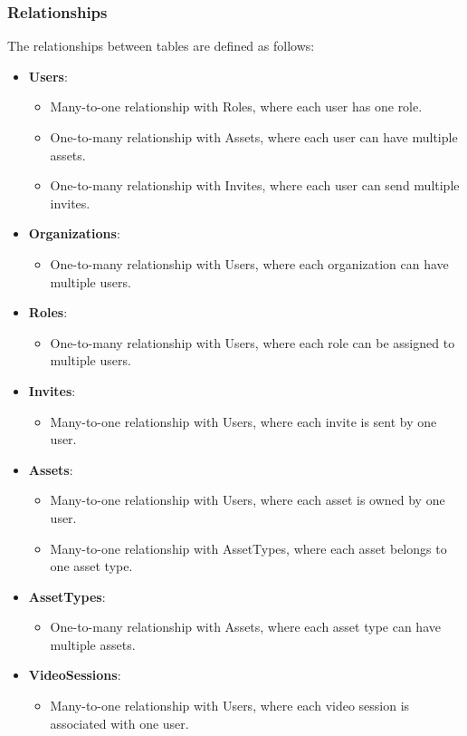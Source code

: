 \subsubsection{Relationships}
The relationships between tables are defined as follows:
\begin{itemize}
    \item \textbf{Users}:
        \begin{itemize}
            \item Many-to-one relationship with Roles, where each user has one role.
            \item One-to-many relationship with Assets, where each user can have multiple assets.
            \item One-to-many relationship with Invites, where each user can send multiple invites.
        \end{itemize}
    \item \textbf{Organizations}:
        \begin{itemize}
            \item One-to-many relationship with Users, where each organization can have multiple users.
        \end{itemize}
    \item \textbf{Roles}:
        \begin{itemize}
            \item One-to-many relationship with Users, where each role can be assigned to multiple users.
        \end{itemize}
    \item \textbf{Invites}:
        \begin{itemize}
            \item Many-to-one relationship with Users, where each invite is sent by one user.
        \end{itemize}
    \item \textbf{Assets}:
        \begin{itemize}
            \item Many-to-one relationship with Users, where each asset is owned by one user.
            \item Many-to-one relationship with AssetTypes, where each asset belongs to one asset type.
        \end{itemize}
    \item \textbf{AssetTypes}:
        \begin{itemize}
            \item One-to-many relationship with Assets, where each asset type can have multiple assets.
        \end{itemize}
    \item \textbf{VideoSessions}:
        \begin{itemize}
            \item Many-to-one relationship with Users, where each video session is associated with one user.
        \end{itemize}
\end{itemize}

